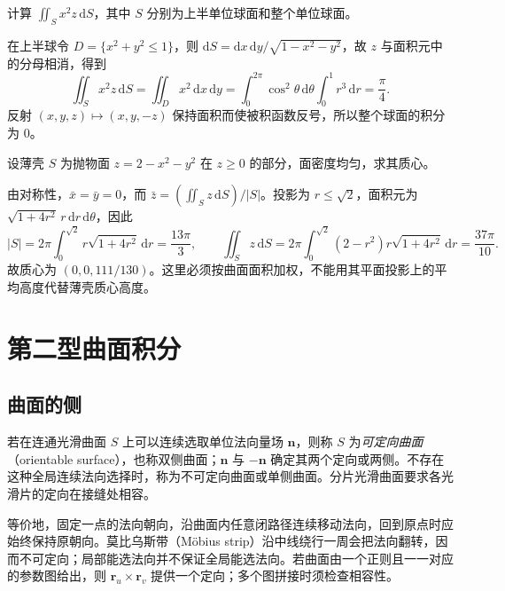 \documentclass[UTF8,12pt,a4paper,fontset=fandol]{ctexbook}
\begin{document}
\begin{example}
\label{ex:first-surface-integral-sphere-oddness}
计算 $\iint_Sx^2z\,\mathrm dS$，其中 $S$ 分别为上半单位球面和整个单位球面。
\end{example}
\begin{solve}
在上半球令 $D=\{x^2+y^2\leq1\}$，则 $\mathrm dS=\mathrm dx\,\mathrm dy/\sqrt{1-x^2-y^2}$，故 $z$ 与面积元中的分母相消，得到
\[
    \iint_Sx^2z\,\mathrm dS
    =\iint_Dx^2\,\mathrm dx\,\mathrm dy
    =\int_0^{2\pi}\cos^2\theta\,\mathrm d\theta\int_0^1r^3\,\mathrm dr
    =\frac\pi4.
\]
反射 $(x,y,z)\mapsto(x,y,-z)$ 保持面积而使被积函数反号，所以整个球面的积分为 $0$。
\end{solve}

\begin{example}
\label{ex:first-surface-integral-paraboloid-centroid}
设薄壳 $S$ 为抛物面 $z=2-x^2-y^2$ 在 $z\geq0$ 的部分，面密度均匀，求其质心。
\end{example}
\begin{solve}
由对称性，$\bar x=\bar y=0$，而 $\bar z=(\iint_Sz\,\mathrm dS)/|S|$。投影为 $r\leq\sqrt2$，面积元为 $\sqrt{1+4r^2}\,r\,\mathrm dr\,\mathrm d\theta$，因此
\[
    |S|=2\pi\int_0^{\sqrt2}r\sqrt{1+4r^2}\,\mathrm dr=\frac{13\pi}3,
    \qquad
    \iint_Sz\,\mathrm dS
    =2\pi\int_0^{\sqrt2}(2-r^2)r\sqrt{1+4r^2}\,\mathrm dr
    =\frac{37\pi}{10}.
\]
故质心为 $(0,0,111/130)$。这里必须按曲面面积加权，不能用其平面投影上的平均高度代替薄壳质心高度。
\end{solve}

\section{第二型曲面积分}
\label{sec:surface-integrals-of-the-second-kind}

\subsection{曲面的侧}
\label{subsec:sides-of-surfaces}

\begin{definition}
\label{def:orientable-surface}
若在连通光滑曲面 $S$ 上可以连续选取单位法向量场 $\boldsymbol n$，则称 $S$ 为\emph{可定向曲面}（orientable surface），也称双侧曲面；$\boldsymbol n$ 与 $-\boldsymbol n$ 确定其两个定向或两侧。不存在这种全局连续法向选择时，称为不可定向曲面或单侧曲面。分片光滑曲面要求各光滑片的定向在接缝处相容。
\end{definition}

等价地，固定一点的法向朝向，沿曲面内任意闭路径连续移动法向，回到原点时应始终保持原朝向。莫比乌斯带（M\"obius strip）沿中线绕行一周会把法向翻转，因而不可定向；局部能选法向并不保证全局能选法向。若曲面由一个正则且一一对应的参数图给出，则 $\boldsymbol r_u\times\boldsymbol r_v$ 提供一个定向；多个图拼接时须检查相容性。
\end{document}
